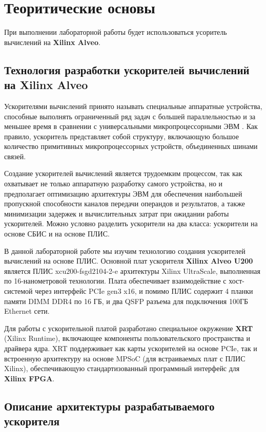 \chapter{Теоритические основы}
При выполнении лабораторной работы будет использоваться усоритель вычислений на \textbf{Xilinx Alveo}.

\section{Технология разработки ускорителей вычислений на Xilinx Alveo}

Ускорителями вычислений принято называть специальные аппаратные устройства, способные выполнять ограниченный ряд задач с большей параллельностью и за меньшее время в сравнении с универсальными микропроцессорными ЭВМ . Как правило, ускоритель представляет собой структуру, включающую большое количество примитивных микропроцессорных устройств, объединенных шинами связей.

Создание ускорителей вычислений является трудоемким процессом, так как охватывает не только аппаратную разработку самого устройства, но и предполагает оптимизацию архитектуры ЭВМ для обеспечения наибольшей пропускной способности каналов передачи операндов и результатов, а также минимизации задержек и вычислительных затрат при ожидании работы ускорителей. Можно условно разделить ускорители на два класса: ускорители на основе СБИС и на основе ПЛИС.

В данной лабораторной работе мы изучим технологию создания ускорителей вычислений на основе ПЛИС. Основной плат ускорителя \textbf{Xilinx Alveo U200} является ПЛИС xcu200-fsgd2104-2-e архитектуры Xilinx UltraScale, выполненная по 16-нанометровой технологии. Плата обеспечивает взаимодействие с хост-системой через интерфейс PCIe gen3 x16, и помимо ПЛИС содержит 4 планки памяти DIMM DDR4 по 16 ГБ, и два QSFP разъема для подключения 100ГБ Ethernet сети.

Для работы с ускорительной платой разработано специальное окружение \textbf{XRT} (Xilinx Runtime), включающее компоненты пользовательского пространства и драйвера ядра. XRT поддерживает как карты ускорителей на основе PCIe, так и встроенную архитектуру на основе MPSoC (для встраиваемых плат с ПЛИС Xilinx), обеспечивающую стандартизованный программный интерфейс для \textbf{Xilinx FPGA}.


\section{Описание архитектуры разрабатываемого ускорителя}

